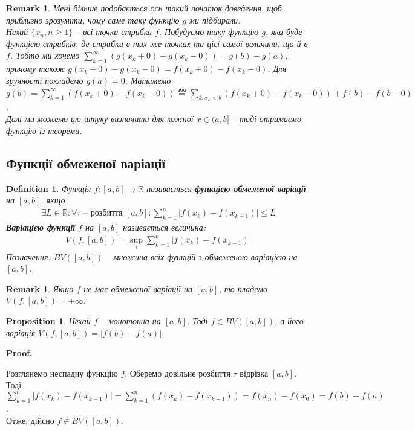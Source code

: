 \documentclass[a4paper, 10pt]{article}
\makeatletter
\def\qed{$\blacksquare$}
\theoremstyle{theoremdd}
\theoremstyle{theoremdd}
\theoremstyle{theoremdd}
\newtheorem{definition}[theorem]{Definition}
\theoremstyle{theoremdd}
\theoremstyle{theoremdd}
\theoremstyle{theoremdd}
\newtheorem{proposition}[theorem]{Proposition}
\theoremstyle{theoremdd}
\newtheorem{remark}[theorem]{Remark}
\theoremstyle{theoremdd}
\theoremstyle{theoremdd}
\renewenvironment{proof}[1][Proof.\\]{\par
\pushQED{\hfill \qed}%
\normalfont \topsep6\p@\@plus6\p@\relax
\trivlist
\item\relax
{\bfseries
#1\@addpunct{.}}\hspace\labelsep\ignorespaces
}{%
\popQED\endtrivlist\@endpefalse
}
\makeatother
\begin{document}
\begin{remark}
Мені більше подобається ось такий початок доведення, щоб приблизно зрозуміти, чому саме таку функцію $g$ ми підбирали.\\
Нехай $\{x_n, n \geq 1\}$ -- всі точки стрибка $f$. Побудуємо таку функцію $g$, яка буде функцією стрибків, де стрибки в тих же точках та цієї самої величини, що й в $f$. Тобто ми хочемо $\displaystyle\sum_{k=1}^\infty (g(x_k+0) - g(x_k-0)) = g(b) - g(a)$, причому також $g(x_k+0) - g(x_k-0) = f(x_k+0) - f(x_k-0)$. Для зручності покладемо $g(a) = 0$. Матимемо $g(b) = \displaystyle\sum_{k=1}^\infty (f(x_k+0) - f(x_k-0)) \overset{\text{або}}{=} \sum_{k: x_k < b} (f(x_k+0) - f(x_k-0)) + f(b) - f(b-0)$.\\
Далі ми можемо цю штуку визначити для кожної $x \in (a,b]$ -- тоді отримаємо функцію із теореми.
\end{remark}

\subsection{Функції обмеженої варіації}
\begin{definition}
Функція $f \colon [a,b] \to \mathbb{R}$ називається \textbf{функцією обмеженої варіації} на $[a,b]$, якщо
\begin{align*}
\exists L \in \mathbb{R}: \forall \tau \text{ -- розбиття } [a,b]: \sum_{k=1}^{n} |f(x_{k}) - f(x_{k-1})| \leq L
\end{align*}
\textbf{Варіацією функції} $f$ на $[a,b]$ називається величина:
\begin{align*}
V(f,[a,b]) = \sup_{\tau} \sum_{k=1}^{n} |f(x_{k}) - f(x_{k-1})|
\end{align*}
Позначення: $BV([a,b])$ -- множина всіх функцій з обмеженою варіацією на $[a,b]$.
\end{definition}

\begin{remark}
Якщо $f$ не має обмеженої варіації на $[a,b]$, то кладемо $V(f,[a,b]) = +\infty$.
\end{remark}

\begin{proposition}
Нехай $f$ -- монотонна на $[a,b]$. Тоді $f \in BV([a,b])$, а його варіація $V(f,[a,b]) = |f(b) - f(a)|$.
\end{proposition}

\begin{proof}
Розглянемо неспадну функцію $f$. Оберемо довільне розбиття $\tau$ відрізка $[a,b]$. Тоді\\
$\displaystyle\sum_{k=1}^{n} |f(x_{k}) - f(x_{k-1})| = \sum_{k=1}^{n} (f(x_{k}) - f(x_{k-1})) = f(x_n) - f(x_0) = f(b) - f(a)$.\\
Отже, дійсно $f \in BV([a,b])$.
\end{proof}
\end{document}
